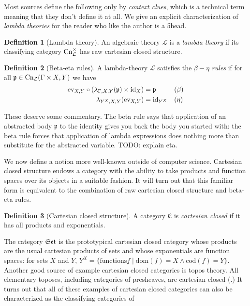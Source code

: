 \documentclass[12pt,twoside]{reedthesis}
\theoremstyle{definition}
\newtheorem{definition}{Definition}
\theoremstyle{remark}
\theoremstyle{plain}
\begin{document}
Most sources define the following only by \emph{context clues}, which is a
technical term meaning that they don't define it at all. We give an explicit
characterization of \emph{lambda theories} for the reader who like the author is
a 5head.

\begin{definition}[Lambda theory]
  An algebraic theory $\mathcal{L}$ is a \emph{lambda theory} if its classifying
  category \( \mathrm{Cn}_{\mathcal{L}}^{\times} \) has raw cartesian closed structure.
\end{definition}

\begin{definition}[Beta-eta rules]
  A lambda-theory $\mathcal{L}$ satisfies the \emph{$\beta-\eta$ rules} if for all
  \( \mathfrak{p} \in \mathrm{Cn}_{\mathcal{L}}(\Gamma \times X,Y) \) we have
  \begin{align*}
    \textrm{ev}_{X,Y} \circ (\lambda_{\Gamma,X,Y}(\mathfrak{p}) \times \textrm{id}_{X}) &= \mathfrak{p} && (\beta) \\
    \lambda_{Y^{X},X,Y}(\textrm{ev}_{X,Y}) &= \textrm{id}_{Y^{X}} && (\eta)\\
  \end{align*}
\end{definition}

These deserve some commentary. The beta rule says that application of an
abstracted body $\mathfrak{p}$ to the identity gives you back the body you
started with: the beta rule forces that application of lambda expressions does
nothing more than substitute for the abstracted variable. TODO: explain eta.

We now define a notion more well-known outside of computer science. Cartesian
closed structure endows a category with the ability to take products and
function spaces over its objects in a suitable fashion. It will turn out that
this familiar form is equivalent to the combination of raw cartesian closed
structure and beta-eta rules.
\begin{definition}[Cartesian closed structure]
  A category \( \mathfrak{C} \) is \emph{cartesian closed} if it has all
  products and exponentials.
\end{definition}

The category \( \mathfrak{Set} \) is the prototypical cartesian closed category whose
products are the usual cartesian products of sets and whose exponentials are
function spaces: for sets $X$ and $Y$, \( Y^{X} = \{ \textrm{functions
} f \mid \textrm{dom}(f) = X \wedge \textrm{cod}(f) = Y \}\). Another good source of
example cartesian closed categories is topos theory. All elementary toposes,
including categories of presheaves, are cartesian closed
(\cite{leinster_informal_2011}.) It turns out that all of these examples of
cartesian closed categories can also be characterized as the classifying
categories of
\end{document}

